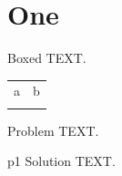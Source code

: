 \documentclass[graybox]{svmult}
\begin{document}
\section{One}
\begin{svgraybox}
Boxed TEXT.
\end{svgraybox}
\begin{tabular}{ll}
\svhline\noalign{\smallskip}
a & b\\
\noalign{\smallskip}\svhline
\end{tabular}
\begin{prob}\label{p1}
Problem TEXT.
\end{prob}
\begin{sol}{p1}
Solution TEXT.
\end{sol}
\end{document}
